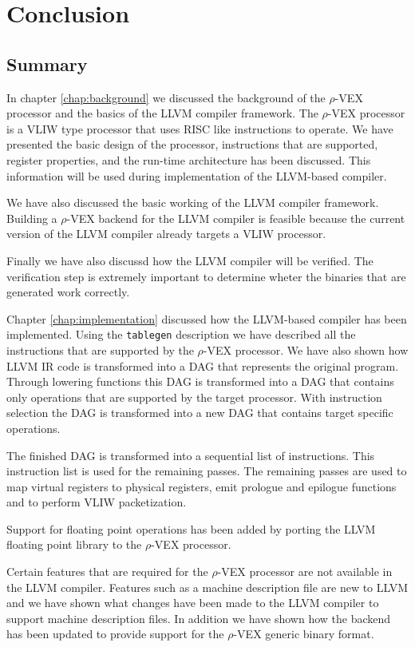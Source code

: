 \chapter{Conclusion}
\label{chap:conclusion}

\section{Summary}
In chapter \ref{chap:background} we discussed the background of the $\rho$-VEX processor and the basics of the LLVM compiler framework. The $\rho$-VEX processor is a VLIW type processor that uses RISC like instructions to operate. We have presented the basic design of the processor, instructions that are supported, register properties, and the run-time architecture has been discussed. This information will be used during implementation of the LLVM-based compiler.

We have also discussed the basic working of the LLVM compiler framework. Building a $\rho$-VEX backend for the LLVM compiler is feasible because the current version of the LLVM compiler already targets a VLIW processor. 

Finally we have also discussd how the LLVM compiler will be verified. The verification step is extremely important to determine wheter the binaries that are generated work correctly.

Chapter \ref{chap:implementation} discussed how the LLVM-based compiler has been implemented. Using the \texttt{tablegen} description we have described all the instructions that are supported by the $\rho$-VEX processor. We have also shown how LLVM IR code is transformed into a DAG that represents the original program. Through lowering functions this DAG is transformed into a DAG that contains only operations that are supported by the target processor. With instruction selection the DAG is transformed into a new DAG that contains target specific operations.

The finished DAG is transformed into a sequential list of instructions. This instruction list is used for the remaining passes. The remaining passes are used to map virtual registers to physical registers, emit prologue and epilogue functions and to perform VLIW packetization.

Support for floating point operations has been added by porting the LLVM floating point library to the $\rho$-VEX processor.

Certain features that are required for the $\rho$-VEX processor are not available in the LLVM compiler. Features such as a machine description file are new to LLVM and we have shown what changes have been made to the LLVM compiler to support machine description files. In addition we have shown how the backend has been updated to provide support for the $\rho$-VEX generic binary format.


